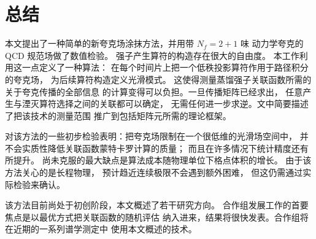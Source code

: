 \section{总结}

本文提出了一种简单的新夸克场涂抹方法，并用带 $N_f=2+1$ 味
动力学夸克的 QCD 规范场做了数值检验。
强子产生算符的构造存在很大的自由度。
本工作利用这一点定义了一种算法：
在每个时间片上把一个低秩投影算符作用于路径积分的夸克场，
为后续算符构造定义光滑模式。
这使得测量蒸馏强子关联函数所需的关于夸克传播的全部信息
的计算变得可以负担。一旦传播矩阵已经求出，
任意产生与湮灭算符选择之间的关联都可以确定，
无需任何进一步求逆。文中简要描述了把该技术的测量范围
推广到包括矩阵元所需的理论框架。

对该方法的一些初步检验表明：把夸克场限制在一个很低维的光滑场空间中，
并不会实质性降低关联函数蒙特卡罗计算的质量；
而且在许多情况下统计精度还有所提升。
尚未克服的最大缺点是算法成本随物理单位下格点体积的增长。
由于该方法关心的是长程物理，
预计趋近连续极限不会遇到额外困难，
但这仍需通过实际检验来确认。

该方法目前尚处于初创阶段，本文概述了若干研究方向。
合作组发展工作的首要焦点是以最优方式把关联函数的随机评估
纳入进来，结果将很快发表。合作组将在近期的一系列谱学测定中
使用本文概述的技术。
